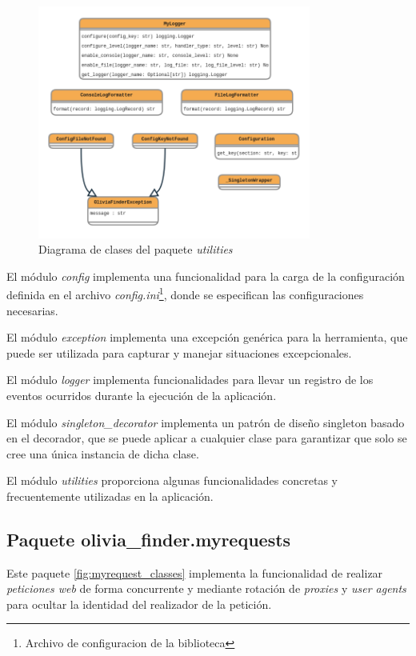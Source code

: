 \begin{figure}[h!]
    \centering
    \includegraphics[width=0.8\textwidth]{img/anexos/utilities_classes.png}
    \caption{Diagrama de clases del paquete \textit{utilities}}
    \label{fig:utilities_classes}
\end{figure}



El módulo \textit{config} implementa una funcionalidad para la carga de la configuración
definida en el archivo \textit{config.ini}\footnote{Archivo de configuracion de la biblioteca}, donde se especifican las configuraciones necesarias.

El módulo \textit{exception} implementa una excepción genérica para la herramienta, que
puede ser utilizada para capturar y manejar situaciones excepcionales.

El módulo \textit{logger} implementa funcionalidades para llevar un registro de los
eventos ocurridos durante la ejecución de la aplicación.

El módulo \textit{singleton\_decorator} implementa un patrón de diseño singleton basado
en el decorador, que se puede aplicar a cualquier clase para garantizar que solo se cree una
única instancia de dicha clase.

El módulo \textit{utilities} proporciona algunas funcionalidades concretas y frecuentemente
utilizadas en la aplicación.

\subsection{Paquete olivia\_finder.myrequests}

Este paquete \ref{fig:myrequest_classes} implementa la funcionalidad de realizar \textit{peticiones web} de forma concurrente
y mediante rotación de \textit{proxies} y \textit{user agents} para ocultar la identidad del realizador
de la petición.

